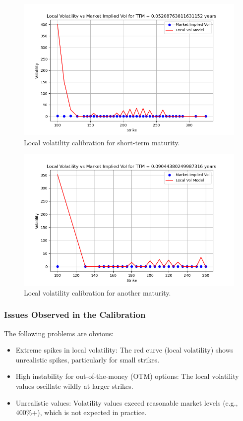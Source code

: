\documentclass[11pt, oneside, a4paper, titlepage]{report}
\begin{document}
\begin{figure}[H]
\centering
\includegraphics[width=1\textwidth]{bad_local_vol.png}
\caption{Local volatility calibration for short-term maturity.}
\label{fig:bad_local_vol}
\end{figure}

\begin{figure}[H]
\centering
\includegraphics[width=1\textwidth]{bad_local_vol_2.png}
\caption{Local volatility calibration for another maturity.}
\label{fig:bad_local_vol_2}
\end{figure}


\subsubsection{Issues Observed in the Calibration}

The following problems are obvious:
\begin{itemize}
\item Extreme spikes in local volatility: The red curve (local volatility) shows unrealistic spikes, particularly for small strikes.
\item High instability for out-of-the-money (OTM) options: The local volatility values oscillate wildly at larger strikes.
\item Unrealistic values: Volatility values exceed reasonable market levels (e.g., 400\%+), which is not expected in practice.
\end{itemize}
\end{document}
